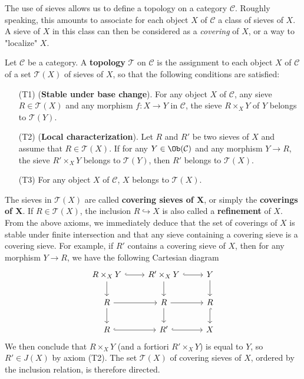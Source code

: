 The use of sieves allows us to define a topology on a category $\mathcal{C}$. Roughly speaking, this amounts to associate for each object $X$ of $\mathcal{C}$ a class of sieves of $X$. A sieve of $X$ in this class can then be considered as a \textit{covering} of $X$, or a way to "localize" $X$.
\begin{definition}
Let $\mathcal{C}$ be a category. A \textbf{topology} $\mathcal{T}$ on $\mathcal{C}$ is the assignment to each object $X$ of $\mathcal{C}$ of a set $\mathcal{T}(X)$ of sieves of $X$, so that the following conditions are satisfied:
\begin{enumerate}[leftmargin=40pt]
\item[(T1)] (\textbf{Stable under base change}). For any object $X$ of $\mathcal{C}$, any sieve $R\in\mathcal{T}(X)$ and any morphism $f:X\to Y$ in $\mathcal{C}$, the sieve $R\times_XY$ of $Y$ belongs to $\mathcal{T}(Y)$.
\item[(T2)] (\textbf{Local characterization}). Let $R$ and $R'$ be two sieves of $X$ and assume that $R\in\mathcal{T}(X)$. If for any $Y\in\Ob(\mathcal{C})$ and any morphism $Y\to R$, the sieve $R'\times_XY$ belongs to $\mathcal{T}(Y)$, then $R'$ belongs to $\mathcal{T}(X)$.
\item[(T3)] For any object $X$ of $\mathcal{C}$, $X$ belongs to $\mathcal{T}(X)$.
\end{enumerate}
\end{definition}
The sieves in $\mathcal{T}(X)$ are called \textbf{covering sieves of $\bm{X}$}, or simply the \textbf{coverings of $\bm{X}$}. If $R\in\mathcal{T}(X)$, the inclusion $R\hookrightarrow X$ is also called a \textbf{refinement} of $X$. From the above axioms, we immediately deduce that the set of coverings of $X$ is stable under finite intersection and that any sieve containing a covering sieve is a covering sieve. For example, if $R'$ contains a covering sieve of $X$, then for any morphism $Y\to R$, we have the following Cartesian diagram
\[\begin{tikzcd}
R\times_XY\ar[r,hook]\ar[d]&R'\times_XY\ar[d]\ar[r,hook]&Y\ar[d]\\
R\ar[d]\ar[r]&R\ar[r]\ar[d]&R\ar[d,hook]\\
R\ar[r,hook]&R'\ar[r,hook]&X
\end{tikzcd}\]
We then conclude that $R\times_XY$ (and a fortiori $R'\times_XY$) is equal to $Y$, so $R'\in J(X)$ by axiom (T2). The set $\mathcal{T}(X)$ of covering sieves of $X$, ordered by the inclusion relation, is therefore directed.\par
